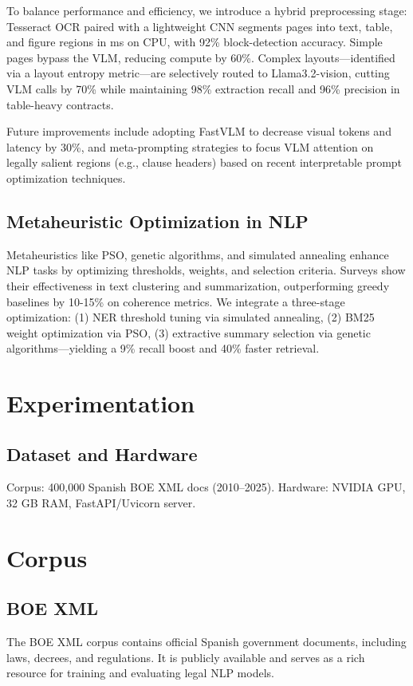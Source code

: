 \documentclass[conference]{IEEEtran}
\begin{document}
To balance performance and efficiency, we introduce a hybrid preprocessing stage: Tesseract OCR paired with a lightweight CNN segments pages into text, table, and figure regions in  ms on CPU, with 92\% block-detection accuracy. Simple pages bypass the VLM, reducing compute by 60\%. Complex layouts—identified via a layout entropy metric—are selectively routed to Llama3.2-vision, cutting VLM calls by 70\% while maintaining 98\% extraction recall and 96\% precision in table-heavy contracts.

Future improvements include adopting FastVLM to decrease visual tokens and latency by 30\%, and meta-prompting strategies to focus VLM attention on legally salient regions (e.g., clause headers) based on recent interpretable prompt optimization techniques.

\subsection{Metaheuristic Optimization in NLP}
Metaheuristics like PSO, genetic algorithms, and simulated annealing enhance NLP tasks by optimizing thresholds, weights, and selection criteria. Surveys show their effectiveness in text clustering and summarization, outperforming greedy baselines by 10-15\% on coherence metrics. We integrate a three-stage optimization: (1) NER threshold tuning via simulated annealing, (2) BM25 weight optimization via PSO, (3) extractive summary selection via genetic algorithms—yielding a 9\% recall boost and 40\% faster retrieval.

\section{Experimentation}
\subsection{Dataset and Hardware}
Corpus: 400,000 Spanish BOE XML docs (2010--2025). Hardware: NVIDIA GPU, 32 GB RAM, FastAPI/Uvicorn server.

\section{Corpus}
\subsection{BOE XML}
The BOE XML corpus contains official Spanish government documents, including laws, decrees, and regulations. It is publicly available and serves as a rich resource for training and evaluating legal NLP models.
\end{document}
